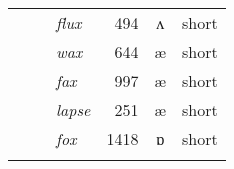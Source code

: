 \begin{table}
\begin{tabular}{lllrcl}
                                                                & ~                                                    & \textit{flux}   & 494       & ʌ     & short          \\
                                                                & ~                                                    & \textit{wax}    & 644       & æ     & short          \\
                                                                & ~                                                    & \textit{fax}    & 997       & æ     & short          \\
                                                                & ~                                                    & \textit{lapse}  & 251       & æ     & short          \\
                                                                & ~                                                    & \textit{fox}    & 1418      & ɒ     & short          \\
\lspbottomrule
\end{tabular}
\end{table}



